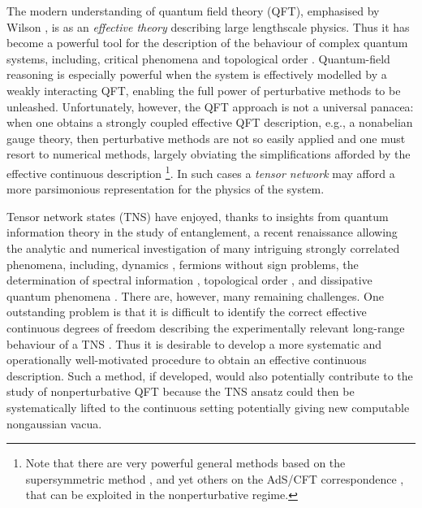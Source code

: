 \documentclass[prl,twocolumn,lengthcheck,superscriptaddress]{revtex4-1}
\theoremstyle{definition}
\theoremstyle{remark}
\begin{document}
The modern understanding of quantum field theory (QFT), emphasised by Wilson \cite{wilson:1975a}, is as an \emph{effective theory} describing large lengthscale physics. Thus it has become a powerful tool for the description of the behaviour of complex quantum systems, including, critical phenomena \cite{sachdev:2011a} and topological order \cite{wen:2007a}. Quantum-field reasoning is especially powerful when the system is effectively modelled by a weakly interacting QFT, enabling the full power of perturbative methods to be unleashed. Unfortunately, however, the QFT approach is not a universal panacea: when one obtains a strongly coupled effective QFT description, e.g., a nonabelian gauge theory, then perturbative methods are not so easily applied and one must resort to numerical methods, largely obviating the simplifications afforded by the effective continuous description \footnote{Note that there are very powerful general methods based on the supersymmetric method \cite{efetov:1997a}, and yet others on the AdS/CFT correspondence \cite{sachdev:2010a}, that can be exploited in the nonperturbative regime.}. In such cases a \emph{tensor network} \cite{orus:2013a} may afford a more parsimonious representation for the physics of the system.

Tensor network states (TNS) have enjoyed, thanks to insights from quantum information theory in the study of entanglement, a recent renaissance allowing the analytic and numerical investigation of many intriguing strongly correlated phenomena, including, dynamics \cite{vidal:2003a, haegeman:2011b,osborne:2005d}, fermions \cite{corboz:2009a, corboz:2010a, corboz:2010b, kraus:2010a} without sign problems, the determination of spectral information \cite{haegeman:2012a}, topological order \cite{aguado:2008a, buerschaper:2009a, koenig:2009a}, and dissipative quantum phenomena \cite{verstraete:2004b, zwolak:2004a, kraus:2012a}. There are, however, many remaining challenges. One outstanding problem is that it is difficult to identify the correct effective continuous degrees of freedom describing the experimentally relevant long-range behaviour of a TNS \cite{verstraete:2010a, haegeman:2011a, jennings:2012a}. Thus it is desirable to develop a more systematic and operationally well-motivated procedure to obtain an effective continuous description. Such a method, if developed, would also potentially contribute to the study of nonperturbative QFT because the TNS ansatz could then be systematically lifted to the continuous setting potentially giving new computable nongaussian vacua. 
\end{document}
